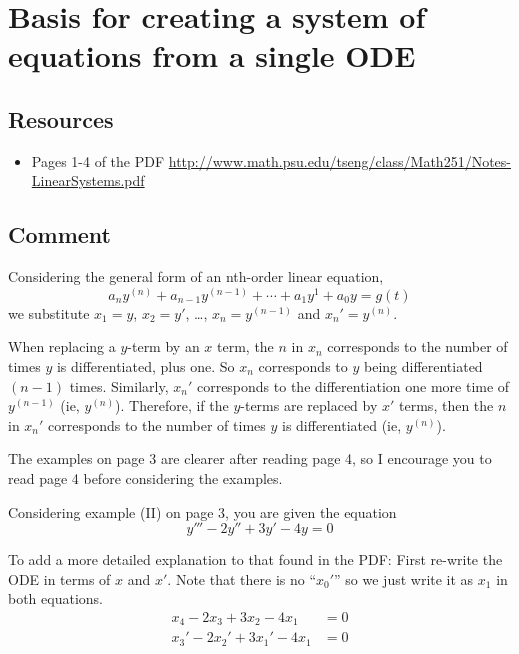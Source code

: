 \newpage
\section{Basis for creating a system of equations from a single ODE}

\subsection*{Resources}
\begin{itemize}
    \item Pages 1-4 of the PDF \url{http://www.math.psu.edu/tseng/class/Math251/Notes-LinearSystems.pdf} 
\end{itemize}

\subsection*{Comment}
Considering the general form of an nth-order linear equation,
\begin{equation}
    a_n y^{(n)} + a_{n-1} y^{(n-1)} + \cdots + a_1 y^1 + a_0 y = g(t)
\end{equation}
we substitute $x_1=y$, $x_2=y'$, \ldots, $x_n=y^{(n-1)}$ and $x_n'=y^{(n)}$.

When replacing a $y$-term by an $x$ term, the $n$ in $x_n$ corresponds to the number of times $y$ is differentiated, plus one. So $x_n$ corresponds to $y$ being differentiated $(n-1)$ times. Similarly, $x_n'$ corresponds to the differentiation one more time of $y^{(n-1)}$ (ie, $y^{(n)}$). Therefore, if the $y$-terms are replaced by $x'$ terms, then the $n$ in $x_n'$ corresponds to the number of times $y$ is differentiated (ie, $y^{(n)}$).

The examples on page 3 are clearer after reading page 4, so I encourage you to read page 4 before considering the examples.

Considering example (II) on page 3, you are given the equation
\begin{equation}
    y''' - 2y'' + 3y' - 4y = 0
\end{equation}

To add a more detailed explanation to that found in the PDF: First re-write the ODE in terms of $x$ and $x'$. Note that there is no ``$x_0'$'' so we just write it as $x_1$ in both equations.
\begin{align}
    x_4 - 2 x_3 + 3 x_2 - 4 x_1 &= 0 \label{eq:xs} \\
    x_3' - 2 x_2' + 3 x_1' - 4 x_1 &= 0 \label{eq:xprimes}
\end{align}

